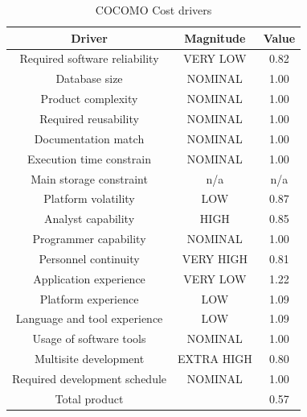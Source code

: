 \begin{table}
\begin{center}
\begin{tabular}{ccc}
\toprule
Driver        				 &   Magnitude   	&    Value \\
\midrule
Required software reliability	 &   VERY LOW   	&    0.82 \\
Database size			 &   NOMINAL   	&    1.00 \\
Product complexity			 &   NOMINAL   	&    1.00 \\
Required reusability			 &   NOMINAL   	&    1.00 \\
Documentation match		 &   NOMINAL   	&    1.00 \\
Execution time constrain		 &   NOMINAL   	&    1.00 \\
Main storage constraint		 &   n/a   		&    n/a \\
Platform volatility			 &   LOW	   	&    0.87 \\
Analyst capability			 &   HIGH	   	&    0.85 \\
Programmer capability		 &   NOMINAL   	&    1.00 \\
Personnel continuity		 &   VERY HIGH   	&    0.81 \\
Application experience		 &   VERY LOW   	&    1.22 \\
Platform experience		 &   LOW 	  	&    1.09 \\
Language and tool experience	 &   LOW	   	&    1.09 \\
Usage of software tools		 &   NOMINAL   	&    1.00 \\
Multisite development		 &   EXTRA HIGH   	&    0.80 \\
Required development schedule	 &   NOMINAL   	&    1.00 \\
\midrule
Total product			 &   		  	&    0.57 \\
\bottomrule
\end{tabular}
\caption{COCOMO Cost drivers}
\end{center}
\end{table}

